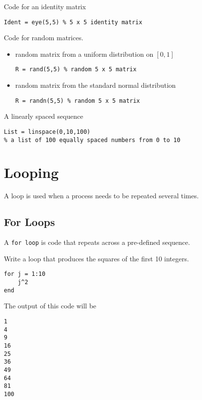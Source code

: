 \begin{example}
    Code for an identity matrix
\begin{lstlisting}
Ident = eye(5,5) % 5 x 5 identity matrix
\end{lstlisting}
\end{example}

\begin{example}
    Code for random matrices.
    \begin{itemize}
        \item random matrix from a uniform distribution on $[0,1]$
\begin{lstlisting}
R = rand(5,5) % random 5 x 5 matrix
\end{lstlisting}
        \item random matrix from the standard normal distribution
\begin{lstlisting}
R = randn(5,5) % random 5 x 5 matrix
\end{lstlisting}
    \end{itemize}
\end{example}

\begin{example}
    A linearly spaced sequence
\begin{lstlisting}
List = linspace(0,10,100)
% a list of 100 equally spaced numbers from 0 to 10
\end{lstlisting}
\end{example}

\section{Looping}
A loop is used when a process needs to be repeated several times.  

\subsection{For Loops}
A \texttt{for loop} is code that repeats across a pre-defined sequence.
\begin{example}
    Write a loop that produces the squares of the first 10 integers.
\begin{lstlisting}
for j = 1:10
    j^2
end
\end{lstlisting}
The output of this code will be
\begin{verbatim}
1
4
9
16
25
36
49
64
81
100
\end{verbatim}
\end{example}

